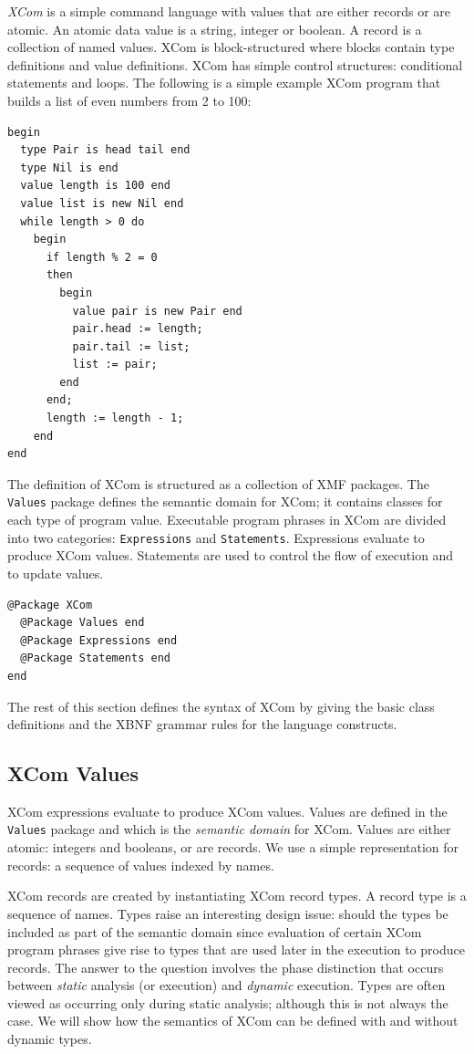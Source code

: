 \documentclass{article}
\begin{document}
\label{Intro}

{\em XCom} is a simple command language with values that are either
records or are atomic. An atomic data value is a string, integer or boolean.
A record is a collection of named values. XCom is block-structured where
blocks contain type definitions and value definitions. XCom has simple 
control structures: conditional statements and loops. The following is a
simple example XCom program that builds a list of even numbers from 2 to 100:
\begin{verbatim}
begin
  type Pair is head tail end
  type Nil is end
  value length is 100 end
  value list is new Nil end
  while length > 0 do
    begin
      if length % 2 = 0
      then
        begin
          value pair is new Pair end
          pair.head := length;
          pair.tail := list;
          list := pair;
        end
      end;
      length := length - 1;
    end
end
\end{verbatim}
The definition of XCom is structured as a collection of XMF packages. The {\tt Values}
package defines the semantic domain for XCom; it contains classes for each type of
program value. Executable program phrases in XCom are divided into two categories: 
{\tt Expressions} and {\tt Statements}. Expressions evaluate to produce XCom values.
Statements are used to control the flow of execution and to update values.
\begin{verbatim}
@Package XCom
  @Package Values end
  @Package Expressions end
  @Package Statements end
end
\end{verbatim}
The rest of this section defines the syntax of XCom by giving the basic class definitions
and the XBNF grammar rules for the language constructs.

\subsection{XCom Values}

XCom expressions evaluate to produce XCom values. Values are defined in the {\tt Values} package
and which is the {\em semantic domain} for XCom. Values are either atomic: integers and booleans, or
are records. We use a simple representation for records: a sequence of values indexed by names.

XCom records are created by instantiating XCom record types. A record type is a sequence of names.
Types raise an interesting design issue: should the types be included as part of the semantic domain
since evaluation of certain XCom program phrases give rise to types that are used later in the
execution to produce records. The answer to the question involves the phase distinction that
occurs between {\em static} analysis (or execution) and {\em dynamic} execution. Types are often
viewed as occurring only during static analysis; although this is not always the case.
We will show how the semantics of XCom can be defined with and without dynamic types.
\end{document}
